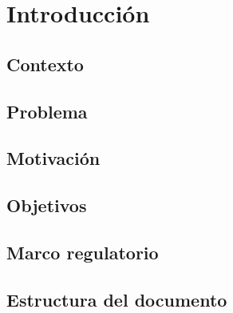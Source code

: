 \chapter{Introducción}
\label{ch:introduction}


\section{Contexto}

\section{Problema}

\section{Motivación}

\section{Objetivos}

\section{Marco regulatorio}

\section{Estructura del documento}
